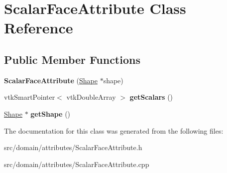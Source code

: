 \hypertarget{class_scalar_face_attribute}{}\section{Scalar\+Face\+Attribute Class Reference}
\label{class_scalar_face_attribute}
\subsection*{Public Member Functions}
\begin{DoxyCompactItemize}
\item 
\hypertarget{class_scalar_face_attribute_ab91f55235326a8a46a4062fb944949c5}{}{\bfseries Scalar\+Face\+Attribute} (\hyperlink{class_shape}{Shape} $\ast$shape)\label{class_scalar_face_attribute_ab91f55235326a8a46a4062fb944949c5}

\item 
\hypertarget{class_scalar_face_attribute_ab7958610eb0617eecaa372867f99abfa}{}vtk\+Smart\+Pointer$<$ vtk\+Double\+Array $>$ {\bfseries get\+Scalars} ()\label{class_scalar_face_attribute_ab7958610eb0617eecaa372867f99abfa}

\item 
\hypertarget{class_scalar_face_attribute_a40fa60eda92082c42bc10edc1a21fe22}{}\hyperlink{class_shape}{Shape} $\ast$ {\bfseries get\+Shape} ()\label{class_scalar_face_attribute_a40fa60eda92082c42bc10edc1a21fe22}

\end{DoxyCompactItemize}


The documentation for this class was generated from the following files\+:\begin{DoxyCompactItemize}
\item 
src/domain/attributes/Scalar\+Face\+Attribute.\+h\item 
src/domain/attributes/Scalar\+Face\+Attribute.\+cpp\end{DoxyCompactItemize}

